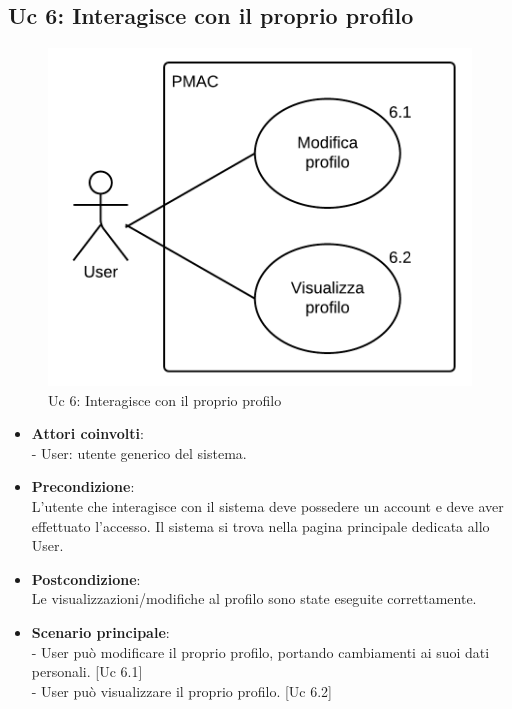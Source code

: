 \documentclass[10pt,a4paper]{article}
\begin{document}
\subsection{Uc 6: Interagisce con il proprio profilo}
\begin{figure}[ht]
\centering
\caption{Uc 6: Interagisce con il proprio profilo}
\includegraphics[scale=0.9]{UseCase/Uc6} %
\end{figure}

\begin{itemize}
\item \textbf{Attori coinvolti}:\\
- User: utente generico del sistema.

\item \textbf{Precondizione}:\\
L'utente che interagisce con il sistema deve possedere un account e deve aver effettuato l'accesso. Il sistema si trova nella pagina principale dedicata allo User.

\item \textbf{Postcondizione}:\\
Le visualizzazioni/modifiche al profilo sono state eseguite correttamente. 

\item \textbf{Scenario principale}:\\
- User può modificare il proprio profilo, portando cambiamenti ai suoi dati personali. [Uc 6.1]\\
- User può visualizzare il proprio profilo. [Uc 6.2]
\end{itemize}
\end{document}
